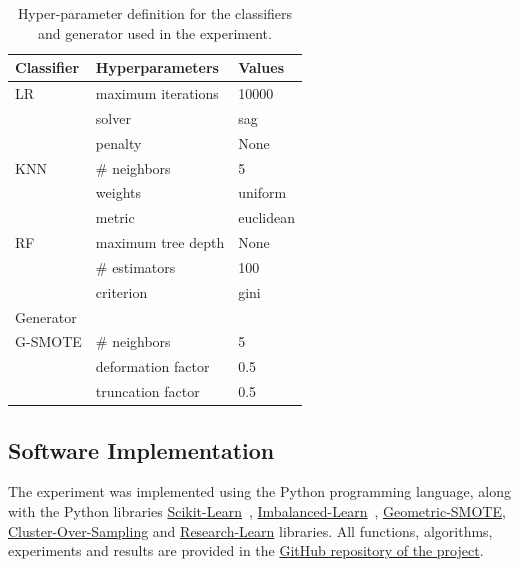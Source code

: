 \documentclass[preprint,12pt]{elsarticle}
\begin{document}
\begin{table}[H]
	\centering
	\begin{tabular}{lll}
		\toprule
		Classifier & Hyperparameters      & Values             \\
		\midrule
		LR         & maximum iterations   & 10000              \\
		           & solver               & sag                \\
                   & penalty              & None               \\
		KNN        & \# neighbors         & 5                  \\
                   & weights              & uniform            \\
                   & metric               & euclidean          \\
		RF         & maximum tree depth   & None               \\
		           & \# estimators        & 100                \\
                   & criterion            & gini               \\
		\toprule
		Generator  &                      &                    \\
		\midrule
		G-SMOTE    & \# neighbors         & 5                  \\
                   & deformation factor   & 0.5                \\
                   & truncation factor    & 0.5                \\
		\bottomrule
	\end{tabular}
    \caption{\label{tab:grid}Hyper-parameter definition for the classifiers and
    generator used in the experiment.}
\end{table}

\subsection{Software Implementation}

The experiment was implemented using the Python programming language, along
with the Python libraries
\href{https://scikit-learn.org/stable/}{Scikit-Learn}~\cite{Pedregosa2011},
\href{https://imbalanced-learn.org/en/stable/}{Imbalanced-Learn}~\cite{JMLR:v18:16-365},
\href{https://geometric-smote.readthedocs.io/en/latest/?badge=latest}{Geometric-SMOTE},
\href{https://cluster-over-sampling.readthedocs.io/en/latest/?badge=latest}{Cluster-Over-Sampling}
and
\href{https://research-learn.readthedocs.io/en/latest/?badge=latest}{Research-Learn}
libraries. All functions, algorithms, experiments and results are provided in
the \href{https://github.com/joaopfonseca/research/}{GitHub repository of the
project}.
\end{document}
